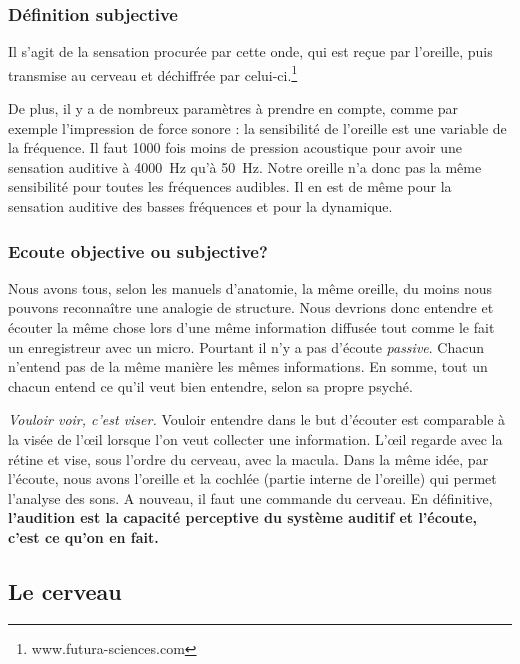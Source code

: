 \subsubsection{Définition subjective}	

	Il s'agit de la sensation procurée
	par cette onde, qui est reçue par l'oreille, puis transmise au cerveau
	et déchiffrée par celui-ci.\footnote{www.futura-sciences.com}

De plus, il y a de nombreux paramètres à prendre en compte, comme par
exemple l'impression de force sonore : la sensibilité de l'oreille
est une variable de la fréquence. Il faut 1000 fois moins de pression
acoustique pour avoir une sensation auditive à \SI{4000}{\hertz} qu'à \SI{50}{\hertz}.
Notre oreille n'a donc pas la même sensibilité pour toutes
les fréquences audibles. Il en est de même pour la sensation auditive
des basses fréquences et pour la dynamique. 

\subsubsection{Ecoute objective ou subjective?}

Nous avons tous,
selon les manuels d'anatomie, la même
oreille, du moins nous pouvons reconnaître une analogie de structure. Nous devrions donc entendre et écouter la même chose
lors d'une même information diffusée tout comme le fait un enregistreur avec un micro. Pourtant il n'y a pas d'écoute \emph{passive}. Chacun n'entend pas de la même manière les mêmes
informations. En somme, tout un chacun entend ce qu'il veut bien
entendre, selon sa propre psyché. 

 \emph{Vouloir voir, c'est viser.}  Vouloir entendre dans le but d'écouter est comparable  à
la visée de l'\oe il lorsque l'on veut collecter une information. L'\oe il regarde avec la rétine et  vise, sous l'ordre du cerveau, avec la macula. Dans la même idée, par l'écoute, nous avons l'oreille et la cochlée (partie interne de l'oreille) qui permet l'analyse des sons. A nouveau, il faut une commande du cerveau.
En définitive, \textbf{ l'audition est la capacité perceptive du système auditif et l'écoute, c'est ce qu'on en fait.}

\subsection{Le cerveau}


